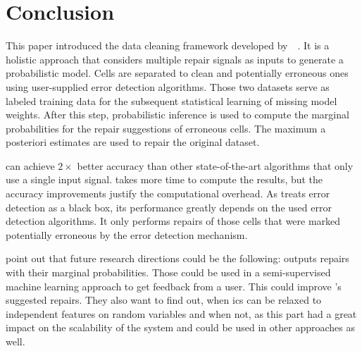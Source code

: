 \section{Conclusion}\label{sec:conclusion}
  This paper introduced the \holoclean{} data cleaning framework developed by~\citeauthor{holoclean}~\cite{holoclean}.
  It is a holistic approach that considers multiple repair signals as inputs to generate a probabilistic model.
  Cells are separated to clean and potentially erroneous ones using user-supplied error detection algorithms.
  Those two datasets serve as labeled training data for the subsequent statistical learning of missing model weights.
  After this step, probabilistic inference is used to compute the marginal probabilities for the repair suggestions of erroneous cells.
  The maximum a posteriori estimates are used to repair the original dataset.

  \holoclean{} can achieve $2 \times$ better accuracy than other state-of-the-art algorithms that only use a single input signal.
  \holoclean{} takes more time to compute the results, but the accuracy improvements justify the computational overhead.
  As \holoclean{} treats error detection as a black box, its performance greatly depends on the used error detection algorithms.
  It only performs repairs of those cells that were marked potentially erroneous by the error detection mechanism.

  \citeauthor{holoclean} point out that future research directions could be the following:
  \holoclean{} outputs repairs with their marginal probabilities.
  Those could be used in a semi-supervised machine learning approach to get feedback from a user.
  This could improve \holoclean{}'s suggested repairs.
  They also want to find out, when \glspl{ic} can be relaxed to independent features on random variables and when not, as this part had a great impact on the scalability of the system and could be used in other approaches as well.

